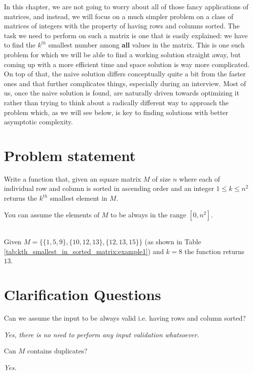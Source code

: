 In this chapter, we are not going to worry about all of those fancy applications of matrices, and instead, we will focus on a much simpler problem on a class of matrices of integers with the property of having rows and columns sorted. The task we need to perform on such a matrix is one that is easily explained: we have to find the $k^{th}$ smallest number among \textbf{all} values in the matrix.
This is one such problem for which we will be able to find a working solution straight away, but coming up with a more efficient time and space solution is way more complicated. 
On top of that, the naive solution differs conceptually quite a bit from the faster ones and that further complicates things, especially during an interview. Most of us, once the naive solution is found, are naturally driven towards optimizing it rather than trying to think about a radically different way to approach the problem which, as we will see below, is key to finding solutions with better asymptotic complexity.



\section{Problem statement}
\begin{exercise}
\label{example:kth_smallest_in_sorted_matrix:exercice1}
Write a function that, given an square matrix $M$ of size $n$  where each of individual row and column is sorted in ascending order and an integer $1 \leq k \leq n^2$
returns the $k^{th}$ smallest element in $M$.


You can assume the elements of $M$ to be always in the range $[0,n^2]$.

    \begin{example}
        \label{example:kth_smallest_in_sorted_matrix:example1}
        \hfill \\
        Given $M=\{\{1,5,9\},\{10,12,13\},\{12,13,15\}\}$ (as shown in Table \ref{tab:kth_smallest_in_sorted_matrix:example1}) and $k=8$ the function returns $13$.
    \end{example}
\end{exercise}




\section{Clarification Questions}

\begin{QandA}
    \item Can we assume the input to be always valid i.e. having rows and column sorted?
    \begin{answered}
        \textit{Yes, there is no need to perform any input validation whatsoever.}
    \end{answered}
    
    \item Can $M$ contains duplicates?
    \begin{answered}
        \textit{Yes.}
    \end{answered}
    
\end{QandA}

